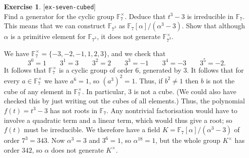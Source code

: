 \documentclass{amsart}
\newcommand{\F}         {{\mathbb{F}}}
\newcommand{\al}        {\alpha}
\newcommand{\sg}        {\sigma}
\newcommand{\tm}        {\times}
\renewcommand{\:}{\colon}
\newcommand{\lastexlabel}{}
\newcommand{\exlabel}[1]{
 \global\def\lastexlabel{#1}\label{#1}[\texttt{#1}]\ \\
}
\newcommand{\exlabel}[1]{
 \global\def\lastexlabel{#1}\label{#1}
}
\newenvironment{solution}{\SolutionInline}{\endSolutionInline}
\theoremstyle{definition}
\newtheorem{exercise}{Exercise}[section]
\renewenvironment{solution}{\SolutionAtEnd}{\endSolutionAtEnd}
\begin{document}
\begin{exercise}\exlabel{ex-seven-cubed}
 Find a generator for the cyclic group $\F_7^\tm$. Deduce that $t^3-3$
 is irreducible in $\F_7$.  This means that we can construct
 $\F_{7^3}$ as $\F_7[\al]/(\al^3-3)$.  Show that although $\al$ is a
 primitive element for $\F_{7^3}$, it does not generate
 $\F_{7^3}^\tm$.
\end{exercise}
\begin{solution}
 We have $\F_7^\tm=\{-3,-2,-1,1,2,3\}$, and we check that 
 \[ 3^0 =  1 \qquad 3^1 =  3 \qquad 3^2=2 \qquad
    3^3 = -1 \qquad 3^4 = -3 \qquad 3^5 = -2.
 \]
 It follows that $\F_7^\tm$ is a cyclic group of order $6$, generated
 by $3$.  It follows that for every $a\in\F_7^\tm$ we have $a^6=1$, so
 $(a^3)^2=1$.  Thus, if $b^2\neq 1$ then $b$ is not the cube of any
 element in $\F_7^\tm$.  In particular, $3$ is not a cube.  (We could
 also have checked this by just writing out the cubes of all
 elements.)  Thus, the polynomial $f(t)=t^3-3$ has not roots in
 $\F_7$.  Any nontrivial factorisation would have to involve a
 quadratic term and a linear term, which would thus give a root; so
 $f(t)$ must be irreducible.  We therefore have a field
 $K=\F_7[\al]/(\al^3-3)$ of order $7^3=343$.  Now $\al^3=3$ and
 $3^6=1$, so $\al^{18}=1$, but the whole group $K^\tm$ has order
 $342$, so $\al$ does not generate $K^\tm$.  

\end{solution}
\end{document}
